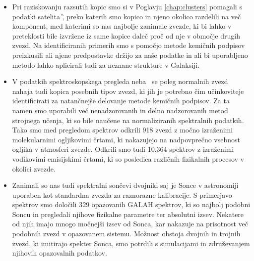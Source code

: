 \begin{itemize}
	\item Pri raziskovanju razsutih kopic smo si v Poglavju \ref{chap:clusters} pomagali s podatki satelita \G, preko katerih smo kopico in njeno okolico razdelili na več komponent, med katerimi so nas najbolje zanimale zvezde, ki bi lahko v preteklosti bile izvržene iz same kopice daleč proč od nje v območje drugih zvezd. Na identificiranih primerih smo s pomočjo metode kemičnih podpisov preizkusili ali njene predpostavke držijo za naše podatke in ali bi uporabljeno metodo lahko aplicirali tudi za neznane strukture v Galaksiji.
	
	\item V podatkih spektroskopskega pregleda neba \Gh\ se poleg normalnih zvezd nahaja tudi kopica posebnih tipov zvezd, ki jih je potrebno čim učinkoviteje identificirati za natančnejše delovanje metode kemičnih podpisov. Za ta namen smo uporabili več nenadzorovanih in delno nadzorovanih metod strojnega učenja, ki so bile naučene na normaliziranih spektralnih podatkih. Tako smo med pregledom spektrov odkrili 918 zvezd z močno izraženimi molekularnimi ogljikovimi črtami, ki nakazujejo na nadpovprečno vsebnost ogljika v atmosferi zvezde. Odkrili smo tudi 10.364 spektrov z izraženimi vodikovimi emisijskimi črtami, ki so posledica različnih fizikalnih procesov v okolici zvezde. 
		
	\item Zanimali so nas tudi spektralni sončevi dvojniki saj je Sonce v astronomiji uporaben kot standardna zvezda za raznorazne kalibracije. S primerjavo spektrov smo določili 329 opazovanih GALAH spektrov, ki so najbolj podobni Soncu in pregledali njihove fizikalne parametre ter absolutni izsev. Nekatere od njih imajo mnogo močnejši izsev od Sonca, kar nakazuje na prisotnost več podobnih zvezd v opazovanem sistemu. Možnost obstoja dvojnih in trojnih zvezd, ki imitirajo spekter Sonca, smo potrdili s simulacijami in združevanjem njihovih opazovalnih podatkov.
	
\end{itemize}


